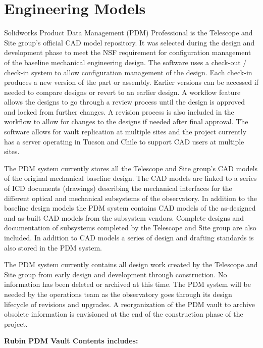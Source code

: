 \newpage
\section{Engineering Models}

Solidworks Product Data Management (PDM) Professional is the Telescope and Site group's official CAD model repository. It was selected during the design and development phase to meet the NSF requirement for configuration management of the baseline mechanical engineering design. The software uses a check-out / check-in system to allow configuration management of the design. Each check-in produces a new version of the part or assembly. Earlier versions can be accessed if needed to compare designs or revert to an earlier design. A workflow feature allows the designs to go through a review process until the design is approved and locked from further changes. A revision process is also included in the workflow to allow for changes to the designs if needed after final approval. The software allows for vault replication at multiple sites and the project currently has a server operating in Tucson and Chile to support CAD users at multiple sites.

The PDM system currently stores all the Telescope and Site group's CAD models of the original mechanical baseline design. The CAD models are linked to a series of ICD documents (drawings) describing the mechanical interfaces for the different optical and mechanical subsystems of the observatory. In addition to the baseline design models the PDM system contains CAD models of the as-designed and as-built CAD models from the subsystem vendors. Complete designs and documentation of subsystems completed by the Telescope and Site group are also included. In addition to CAD models a series of design and drafting standards is also stored in the PDM system.

The PDM system currently contains all design work created by the Telescope and Site group from early design and development through construction. No information has been deleted or archived at this time. The PDM system will be needed by the operations team as the observatory goes through its design lifecycle of revisions and upgrades. A reorganization of the PDM vault to archive obsolete information is envisioned at the end of the construction phase of the project.

{\bf Rubin PDM Vault Contents includes:}

